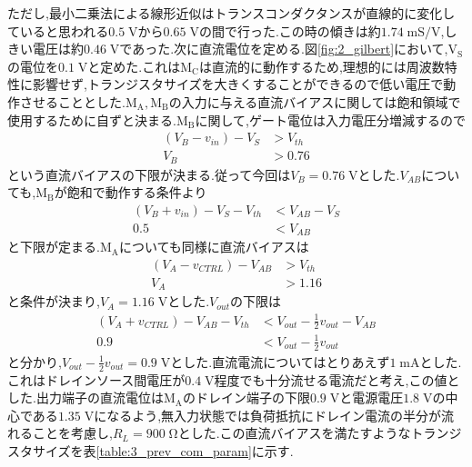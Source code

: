         ただし,最小二乗法による線形近似はトランスコンダクタンスが直線的に変化していると思われる$0.5\;\mathrm{V}$から$0.65\;\mathrm{V}$の間で行った.この時の傾きは約$1.74\;\mathrm{mS/V}$,しきい電圧は約$0.46\;\mathrm{V}$であった.次に直流電位を定める.図\ref{fig:2_gilbert}において,$\mathrm{V_{S}}$の電位を$0.1\;\mathrm{V}$と定めた.これは$\mathrm{M_{C}}$は直流的に動作するため,理想的には周波数特性に影響せず,トランジスタサイズを大きくすることができるので低い電圧で動作させることとした.$\mathrm{M_{A},M_{B}}$の入力に与える直流バイアスに関しては飽和領域で使用するために自ずと決まる.$\mathrm{M_{B}}$に関して,ゲート電位は入力電圧分増減するので
        \begin{align*}
            \left( V_{B}-v_{in} \right) -V_{S} &> V_{th}  \\
            V_{B} &> 0.76
        \end{align*}
        という直流バイアスの下限が決まる.従って今回は$V_{B}=0.76\;\mathrm{V}$とした.$V_{AB}$についても,$\mathrm{M_{B}}$が飽和で動作する条件より
        \begin{align*}
            \left( V_{B}+v_{in} \right) - V_{S} -V_{th} &< V_{AB} - V_{S}   \\
            0.5 &< V_{AB}  
        \end{align*}
        と下限が定まる.$\mathrm{M_{A}}$についても同様に直流バイアスは
        \begin{align*}
            \left( V_{A}-v_{CTRL} \right) -V_{AB} &> V_{th}  \\
            V_{A} &> 1.16
        \end{align*}
        と条件が決まり,$V_{A}=1.16\;\mathrm{V}$とした.$V_{out}$の下限は
        \begin{align*}
            \left( V_{A}+v_{CTRL} \right) - V_{AB} -V_{th} &< V_{out} - \frac{1}{2}v_{out} - V_{AB}   \\
            0.9 &< V_{out} - \frac{1}{2}v_{out}
        \end{align*}
        と分かり,$V_{out}-\frac{1}{2}v_{out}=0.9\;\mathrm{V}$とした.直流電流についてはとりあえず$1\;\mathrm{mA}$とした.これはドレインソース間電圧が$0.4\;\mathrm{V}$程度でも十分流せる電流だと考え,この値とした.出力端子の直流電位は$\mathrm{M_{A}}$のドレイン端子の下限$0.9\;\mathrm{V}$と電源電圧$1.8\;\mathrm{V}$の中心である$1.35\;\mathrm{V}$になるよう,無入力状態では負荷抵抗にドレイン電流の半分が流れることを考慮し,$R_{L}=900\;\mathrm{\Omega}$とした.この直流バイアスを満たすようなトランジスタサイズを表\ref{table:3_prev_com_param}に示す.\par
